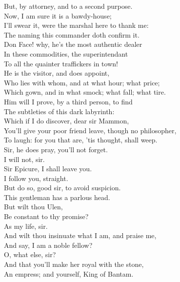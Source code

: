 \documentclass[a4paper,oneside]{memoir}
\begin{document}
\begin{drama*}
But, by attorney, and to a second purpose.\\
Now, I am sure it is a bawdy-house;\\
I'll swear it, were the marshal here to thank me:\\
The naming this commander doth confirm it.\\
Don Face! why, he's the most authentic dealer\\
In these commodities, the superintendant\\
To all the quainter traffickers in town!\\
He is the visitor, and does appoint,\\
Who lies with whom, and at what hour; what price;\\
Which gown, and in what smock; what fall; what tire.\\
Him will I prove, by a third person, to find\\
The subtleties of this dark labyrinth:\\
Which if I do discover, dear sir Mammon,\\
You'll give your poor friend leave, though no philosopher,\\
To laugh: for you that are, 'tis thought, shall weep.\\
\facespeaks Sir, he does pray, you'll not forget.\\
\surlyspeaks {} I will not, sir.\\
Sir Epicure, I shall leave you.\\
\mammonspeaks {} I follow you, straight.\\
\facespeaks But do so, good sir, to avoid suspicion.\\
This gentleman has a parlous head.\\
\mammonspeaks But wilt thou Ulen,\\
Be constant to thy promise?\\
\facespeaks {} As my life, sir.\\
\mammonspeaks And wilt thou insinuate what I am, and praise me,\\
And say, I am a noble fellow?\\
\facespeaks {} O, what else, sir?\\
And that you'll make her royal with the stone,\\
An empress; and yourself, King of Bantam.\\

\end{drama*}
\end{document}
